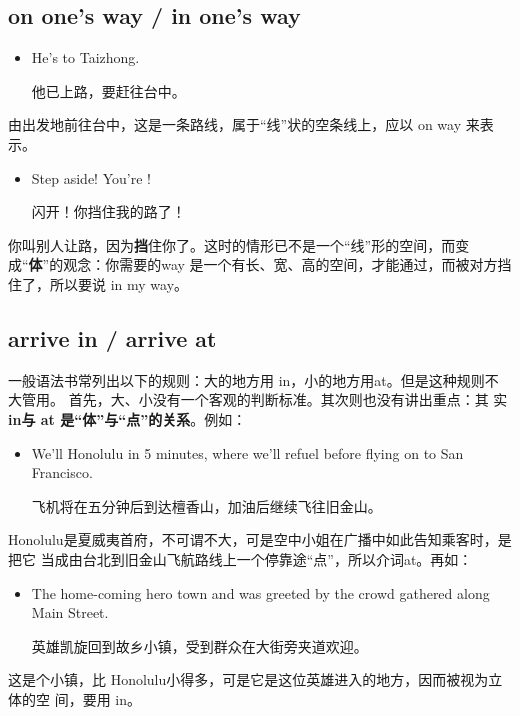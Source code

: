 \subsection{on one's way / in one's way}

\begin{itemize}
\item  He's  to Taizhong.

  他已上路，要赶往台中。
\end{itemize}
由出发地前往台中，这是一条路线，属于“线”状的空条线上，应以 on way 来表示。

\begin{itemize}
\item  Step aside! You're !

  闪开！你挡住我的路了！
\end{itemize}
你叫别人让路，因为\textbf{挡}住你了。这时的情形已不是一个“线”形的空间，而变
成“\textbf{体}”的观念：你需要的way 是一个有长、宽、高的空间，才能通过，而被对方挡
住了，所以要说 in my way。

\subsection{arrive in / arrive at}

一般语法书常列出以下的规则：大的地方用 in，小的地方用at。但是这种规则不大管用。
首先，大、小没有一个客观的判断标准。其次则也没有讲出重点：其
实\textbf{in与 at 是“体”与“点”的关系}。例如：

\begin{itemize}
\item We'll  Honolulu in 5 minutes, where we'll refuel before
  flying on to San Francisco.

  飞机将在五分钟后到达檀香山，加油后继续飞往旧金山。
\end{itemize}
Honolulu是夏威夷首府，不可谓不大，可是空中小姐在广播中如此告知乘客时，是把它
当成由台北到旧金山飞航路线上一个停靠途“点”，所以介词at。再如：
\begin{itemize}
\item The home-coming hero  town and was greeted by the crowd
  gathered along Main Street.

  英雄凯旋回到故乡小镇，受到群众在大街旁夹道欢迎。
\end{itemize}
这是个小镇，比 Honolulu小得多，可是它是这位英雄进入的地方，因而被视为立体的空
间，要用 in。

